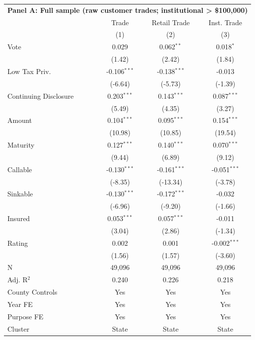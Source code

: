 \begingroup
\centering
\begin{tabular*}{\textwidth}{@{\extracolsep{\fill}}lccc}
\multicolumn{5}{l}{\textbf{Panel A: Full sample (raw customer trades; institutional > \$100,000)}}\\

\addlinespace
   \toprule
                         & Trade          & Retail Trade   & Inst. Trade\\  
                         & (1)            & (2)            & (3)\\  
   \midrule 
   Vote                  & 0.029          & 0.062$^{**}$   & 0.018$^{*}$\\   
                         & (1.42)        & (2.42)        & (1.84)\\   
   Low Tax Priv.         & -0.106$^{***}$ & -0.138$^{***}$ & -0.013\\   
                         & (-6.64)       & (-5.73)       & (-1.39)\\   
   Continuing Disclosure & 0.203$^{***}$  & 0.143$^{***}$  & 0.087$^{***}$\\   
                         & (5.49)        & (4.35)        & (3.27)\\   
   Amount                & 0.104$^{***}$  & 0.095$^{***}$  & 0.154$^{***}$\\   
                         & (10.98)       & (10.85)       & (19.54)\\   
   Maturity              & 0.127$^{***}$  & 0.140$^{***}$  & 0.070$^{***}$\\   
                         & (9.44)        & (6.89)        & (9.12)\\   
   Callable              & -0.130$^{***}$ & -0.161$^{***}$ & -0.051$^{***}$\\   
                         & (-8.35)       & (-13.34)      & (-3.78)\\   
   Sinkable              & -0.130$^{***}$ & -0.172$^{***}$ & -0.032\\   
                         & (-6.96)       & (-9.20)       & (-1.66)\\   
   Insured               & 0.053$^{***}$  & 0.057$^{***}$  & -0.011\\   
                         & (3.04)        & (2.86)        & (-1.34)\\   
   Rating                & 0.002          & 0.001          & -0.002$^{***}$\\   
                         & (1.56)        & (1.57)        & (-3.60)\\   
   \hline
   N          & 49,096         & 49,096         & 49,096\\  
   Adj. R$^2$        & 0.240          & 0.226          & 0.218\\  
   County Controls       & Yes            & Yes            & Yes\\  
   Year FE               & Yes            & Yes            & Yes\\  
   Purpose FE            & Yes            & Yes            & Yes\\  
   Cluster              & State & State & State\\  
   \bottomrule
\end{tabular*}
\par\endgroup
